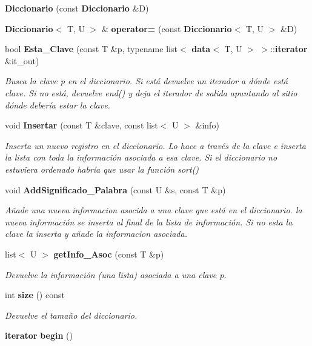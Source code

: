 \begin{DoxyCompactItemize}
\item 
{\bfseries Diccionario} (const {\bf Diccionario} \&D)\label{classDiccionario_ad8917f4e401b473139403dc5964e8307}

\item 
{\bf Diccionario}$<$ T, U $>$ \& {\bfseries operator=} (const {\bf Diccionario}$<$ T, U $>$ \&D)\label{classDiccionario_abc9504855c268dcdffb7e117489992f6}

\item 
bool {\bf Esta\+\_\+\+Clave} (const T \&p, typename list$<$ {\bf data}$<$ T, U $>$ $>$\+::{\bf iterator} \&it\+\_\+out)
\begin{DoxyCompactList}\small\item\em Busca la clave p en el diccionario. Si está devuelve un iterador a dónde está clave. Si no está, devuelve end() y deja el iterador de salida apuntando al sitio dónde debería estar la clave. \end{DoxyCompactList}\item 
void {\bf Insertar} (const T \&clave, const list$<$ U $>$ \&info)
\begin{DoxyCompactList}\small\item\em Inserta un nuevo registro en el diccionario. Lo hace a través de la clave e inserta la lista con toda la información asociada a esa clave. Si el diccionario no estuviera ordenado habría que usar la función sort() \end{DoxyCompactList}\item 
void {\bf Add\+Significado\+\_\+\+Palabra} (const U \&s, const T \&p)
\begin{DoxyCompactList}\small\item\em Añade una nueva informacion asocida a una clave que está en el diccionario. la nueva información se inserta al final de la lista de información. Si no esta la clave la inserta y añade la informacion asociada. \end{DoxyCompactList}\item 
list$<$ U $>$ {\bf get\+Info\+\_\+\+Asoc} (const T \&p)
\begin{DoxyCompactList}\small\item\em Devuelve la información (una lista) asociada a una clave p. \end{DoxyCompactList}\item 
int {\bf size} () const \label{classDiccionario_aee09a7283def9dc0d94b079887fff66e}

\begin{DoxyCompactList}\small\item\em Devuelve el tamaño del diccionario. \end{DoxyCompactList}\item 
{\bf iterator} {\bfseries begin} ()\label{classDiccionario_aa17ce3d7317d78f5927ae7c0564089cc}


\end{DoxyCompactItemize}
